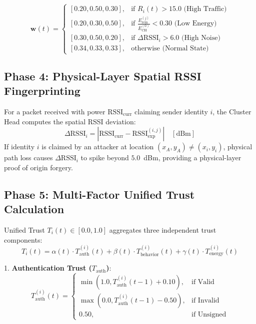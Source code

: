 \documentclass[journal]{IEEEtran}
\begin{document}
\begin{equation}
\boldsymbol{w}(t) = \begin{cases} 
[0.20, 0.50, 0.30], & \text{if } R_i(t) > 15.0 \text{ (High Traffic)} \\
[0.20, 0.30, 0.50], & \text{if } \frac{E_{\text{rem}}^{(j)}}{E_{\text{CH}}^{(0)}} < 0.30 \text{ (Low Energy)} \\
[0.30, 0.50, 0.20], & \text{if } \Delta \text{RSSI}_i > 6.0 \text{ (High Noise)} \\
[0.34, 0.33, 0.33], & \text{otherwise (Normal State)}
\end{cases}
\end{equation}

\subsection{Phase 4: Physical-Layer Spatial RSSI Fingerprinting}
For a packet received with power $\text{RSSI}_{\text{curr}}$ claiming sender identity $i$, the Cluster Head computes the spatial RSSI deviation:
\begin{equation}
\Delta \text{RSSI}_i = \left| \text{RSSI}_{\text{curr}} - \text{RSSI}_{\text{exp}}^{(i, j)} \right| \quad [\text{dBm}]
\end{equation}
If identity $i$ is claimed by an attacker at location $(x_A, y_A) \neq (x_i, y_i)$, physical path loss causes $\Delta \text{RSSI}_i$ to spike beyond $5.0$~dBm, providing a physical-layer proof of origin forgery.

\subsection{Phase 5: Multi-Factor Unified Trust Calculation}
Unified Trust $T_i(t) \in [0.0, 1.0]$ aggregates three independent trust components:
\begin{equation}
T_i(t) = \alpha(t) \cdot T_{\text{auth}}^{(i)}(t) + \beta(t) \cdot T_{\text{behavior}}^{(i)}(t) + \gamma(t) \cdot T_{\text{energy}}^{(i)}(t)
\end{equation}

1. \textbf{Authentication Trust ($T_{\text{auth}}$)}:
\begin{equation}
T_{\text{auth}}^{(i)}(t) = \begin{cases} 
\min(1.0, T_{\text{auth}}^{(i)}(t-1) + 0.10), & \text{if Valid} \\
\max(0.0, T_{\text{auth}}^{(i)}(t-1) - 0.50), & \text{if Invalid} \\
0.50, & \text{if Unsigned}
\end{cases}
\end{equation}
\end{document}
